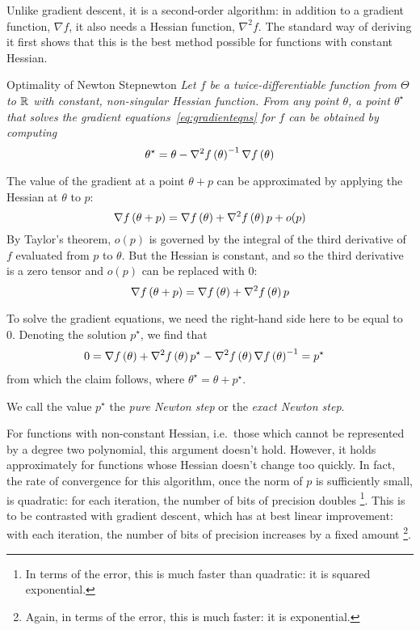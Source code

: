 \documentclass[../../thesis.tex]{subfiles}
\begin{document}
Unlike gradient descent,
it is a second-order algorithm:
in addition to a gradient function, $\nabla f$,
it also needs a Hessian function, $\nabla^2 f$.
The standard way of deriving it first shows
that this is the best method possible for functions
with constant Hessian.

\begin{theorem}{Optimality of Newton Step}{newton}
	\emph{Let $f$ be a twice-differentiable function
	from $\Theta$ to $\mathbb{R}$
	with constant, non-singular Hessian function.
	From any point $\theta$, a point $\theta^\star$
	that solves the gradient equations~\ref{eq:gradienteqns}
	for $f$ can be obtained by computing
	\begin{equation}
		\theta^\star = \theta - \nabla^2f\left(\theta\right)^{-1}\nabla f\left(\theta\right)
	\end{equation}}

	The value of the gradient at a point $\theta + p$
	can be approximated by applying
	the Hessian at $\theta$ to $p$:
	\begin{equation}
		\nabla f\left(\theta + p\right) = \nabla f\left(\theta\right) + \nabla^2f\left(\theta\right)p + o(p)
	\end{equation}
	\noindent By Taylor's theorem,
	$o(p)$ is governed by the integral of the third derivative
	of $f$ evaluated from $p$ to $\theta$.
	But the Hessian is constant, and so the third derivative is a
	zero tensor and	$o(p)$ can be replaced with $0$:
	\begin{equation}
		\nabla f\left(\theta + p\right) = \nabla f\left(\theta\right) + \nabla^2f\left(\theta\right)p
	\end{equation}

	To solve the gradient equations,
	we need the right-hand side here to be equal to 0.
	Denoting the solution $p^\star$, we find that
	\begin{align}
		0 &= \nabla f\left(\theta\right) + \nabla^2f\left(\theta\right)p^\star
		-\nabla^2f\left(\theta\right)\nabla f\left(\theta\right)^{-1} = p^\star
	\end{align}
	\noindent from which the claim follows,
	where $\theta^\star = \theta + p^\star$.
\end{theorem}

We call the value $p^\star$ the \emph{pure Newton step}
or the \emph{exact Newton step}.

For functions with non-constant Hessian,
i.e.~those which cannot be represented by a degree two polynomial,
this argument doesn't hold.
However, it holds approximately for functions whose Hessian
doesn't change too quickly.
In fact, the rate of convergence for this algorithm,
once the norm of $p$ is sufficiently small,
is quadratic:
for each iteration, the number of bits of precision doubles%
\footnote{In terms of the error, this is much faster than quadratic:
it is squared exponential.}.
This is to be contrasted with gradient descent,
which has at best linear improvement:
with each iteration, the number of bits of precision increases by a fixed amount%
\footnote{Again, in terms of the error, this is much faster:
it is exponential.}.
\end{document}
